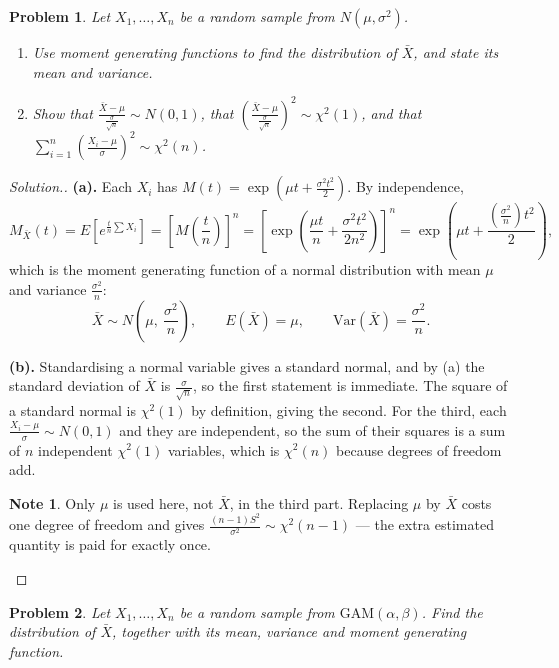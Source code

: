 \documentclass[12pt,a4paper]{report}
\theoremstyle{definition}
\newtheorem{note}[thm]{Note}
\theoremstyle{plain}
\newtheorem{problemx}{Problem}[section]
\newenvironment{problem}{\begin{problemx}}{\end{problemx}}
\newenvironment{solution}
  {\renewcommand{\qedsymbol}{}\begin{proof}[\textit{Solution}.]}
  {\end{proof}}
\begin{document}
\begin{problem}
Let $X_1,\ldots,X_n$ be a random sample from $N\left(\mu,\sigma^2\right)$.
\begin{enumerate}
\item[(a).] Use moment generating functions to find the distribution of $\bar X$,
and state its mean and variance.
\item[(b).] Show that
$\frac{\bar X-\mu}{\frac{\sigma}{\sqrt n}}\sim N(0,1)$, that
$\left(\frac{\bar X-\mu}{\frac{\sigma}{\sqrt n}}\right)^2\sim\chi^2(1)$, and that
$\sum_{i=1}^n\left(\frac{X_i-\mu}{\sigma}\right)^2\sim\chi^2(n)$.
\end{enumerate}
\end{problem}

\begin{solution}
\textbf{(a).} Each $X_i$ has $M(t)=\exp\left(\mu t+\frac{\sigma^2t^2}{2}\right)$.
By independence,
\[M_{\bar X}(t)=E\left[e^{\frac{t}{n}\sum X_i}\right]
=\left[M\!\left(\frac{t}{n}\right)\right]^n
=\left[\exp\left(\frac{\mu t}{n}+\frac{\sigma^2t^2}{2n^2}\right)\right]^n
=\exp\left(\mu t+\frac{\left(\frac{\sigma^2}{n}\right)t^2}{2}\right),\]
which is the moment generating function of a normal distribution with mean $\mu$
and variance $\frac{\sigma^2}{n}$:
\[\bar X\sim N\!\left(\mu,\ \frac{\sigma^2}{n}\right),\qquad
E\left(\bar X\right)=\mu,\qquad
\text{Var}\left(\bar X\right)=\frac{\sigma^2}{n}.\]

\textbf{(b).} Standardising a normal variable gives a standard normal, and by (a)
the standard deviation of $\bar X$ is $\frac{\sigma}{\sqrt n}$, so the first
statement is immediate. The square of a standard normal is $\chi^2(1)$ by
definition, giving the second. For the third, each
$\frac{X_i-\mu}{\sigma}\sim N(0,1)$ and they are independent, so the sum of their
squares is a sum of $n$ independent $\chi^2(1)$ variables, which is $\chi^2(n)$
because degrees of freedom add.

\begin{note}
Only $\mu$ is used here, not $\bar X$, in the third part. Replacing $\mu$ by
$\bar X$ costs one degree of freedom and gives
$\frac{(n-1)S^2}{\sigma^2}\sim\chi^2(n-1)$ --- the extra estimated quantity is
paid for exactly once.
\end{note}
\end{solution}

\begin{problem}
Let $X_1,\ldots,X_n$ be a random sample from $\text{GAM}(\alpha,\beta)$. Find the
distribution of $\bar X$, together with its mean, variance and moment generating
function.
\end{problem}
\end{document}
